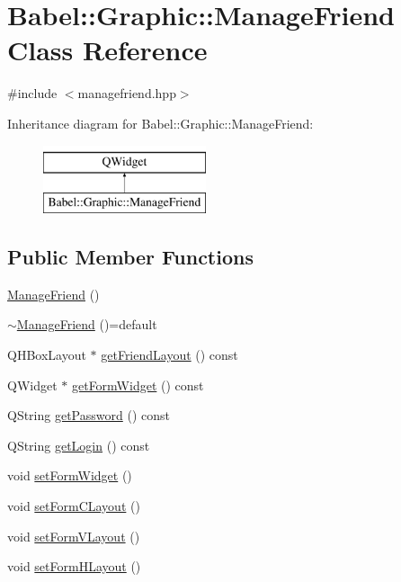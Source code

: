 \hypertarget{classBabel_1_1Graphic_1_1ManageFriend}{}\section{Babel\+:\+:Graphic\+:\+:Manage\+Friend Class Reference}
\label{classBabel_1_1Graphic_1_1ManageFriend}


{\ttfamily \#include $<$managefriend.\+hpp$>$}

Inheritance diagram for Babel\+:\+:Graphic\+:\+:Manage\+Friend\+:\begin{figure}[H]
\begin{center}
\leavevmode
\includegraphics[height=2.000000cm]{classBabel_1_1Graphic_1_1ManageFriend}
\end{center}
\end{figure}
\subsection*{Public Member Functions}
\begin{DoxyCompactItemize}
\item 
\hyperlink{classBabel_1_1Graphic_1_1ManageFriend_a483556a0213270225f88cd06db92f7c5}{Manage\+Friend} ()
\item 
\hyperlink{classBabel_1_1Graphic_1_1ManageFriend_a12d0aaad969f631b4db80af38eb7fc9b}{$\sim$\+Manage\+Friend} ()=default
\item 
Q\+H\+Box\+Layout $\ast$ \hyperlink{classBabel_1_1Graphic_1_1ManageFriend_a0bf570dcedd6de1c9c1e52ec07c959ba}{get\+Friend\+Layout} () const
\item 
Q\+Widget $\ast$ \hyperlink{classBabel_1_1Graphic_1_1ManageFriend_a168aaf8141a6447f92a9d2f059af4b98}{get\+Form\+Widget} () const
\item 
Q\+String \hyperlink{classBabel_1_1Graphic_1_1ManageFriend_ae6e8798c283cbb84134b84bf113bde3d}{get\+Password} () const
\item 
Q\+String \hyperlink{classBabel_1_1Graphic_1_1ManageFriend_aee17ef4eacf0a66fc6ea19e93d35e85d}{get\+Login} () const
\item 
void \hyperlink{classBabel_1_1Graphic_1_1ManageFriend_a45d5e02d704042395e8de3c78103ea28}{set\+Form\+Widget} ()
\item 
void \hyperlink{classBabel_1_1Graphic_1_1ManageFriend_a400fddfc5fd678043555264245cad464}{set\+Form\+C\+Layout} ()
\item 
void \hyperlink{classBabel_1_1Graphic_1_1ManageFriend_ae86b93a24b1734171293e179a8e10669}{set\+Form\+V\+Layout} ()
\item 
void \hyperlink{classBabel_1_1Graphic_1_1ManageFriend_a6f2e252aee82d770bd4488b971914396}{set\+Form\+H\+Layout} ()
\end{DoxyCompactItemize}


